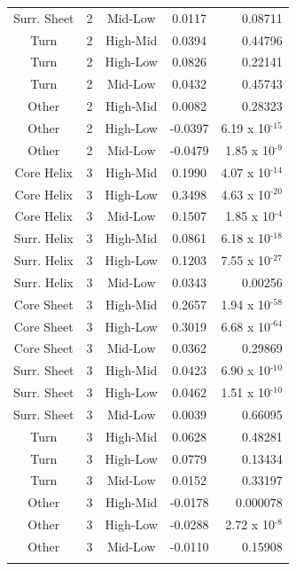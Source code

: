 \begin{table}[H]
\begin{tabular}{@{}ccccr@{}}
Surr. Sheet & 2 & Mid-Low  & 0.0117  & 0.08711                   \\
\arrayrulecolor[gray]{0.8}\hline
Turn        & 2 & High-Mid & 0.0394  & 0.44796                   \\
Turn        & 2 & High-Low & 0.0826  & 0.22141                   \\
Turn        & 2 & Mid-Low  & 0.0432  & 0.45743                   \\
\arrayrulecolor[gray]{0.8}\hline
Other       & 2 & High-Mid & 0.0082  & 0.28323                   \\
Other       & 2 & High-Low & -0.0397 & 6.19 x 10\(^{\text{-15}}\)  \\
Other       & 2 & Mid-Low  & -0.0479 & 1.85 x 10\(^{\text{-9}}\)   \\
\arrayrulecolor[gray]{0.8}\hline
Core Helix  & 3 & High-Mid & 0.1990  & 4.07 x 10\(^{\text{-14}}\)  \\
Core Helix  & 3 & High-Low & 0.3498  & 4.63 x 10\(^{\text{-20}}\)  \\
Core Helix  & 3 & Mid-Low  & 0.1507  & 1.85 x 10\(^{\text{-4}}\)   \\
\arrayrulecolor[gray]{0.8}\hline
Surr. Helix & 3 & High-Mid & 0.0861  & 6.18 x 10\(^{\text{-18}}\)  \\
Surr. Helix & 3 & High-Low & 0.1203  & 7.55 x 10\(^{\text{-27}}\)  \\
Surr. Helix & 3 & Mid-Low  & 0.0343  & 0.00256                   \\
\arrayrulecolor[gray]{0.8}\hline
Core Sheet  & 3 & High-Mid & 0.2657  & 1.94 x 10\(^{\text{-58}}\)  \\
Core Sheet  & 3 & High-Low & 0.3019  & 6.68 x 10\(^{\text{-64}}\)  \\
Core Sheet  & 3 & Mid-Low  & 0.0362  & 0.29869                   \\
\arrayrulecolor[gray]{0.8}\hline
Surr. Sheet & 3 & High-Mid & 0.0423  & 6.90 x 10\(^{\text{-10}}\)  \\
Surr. Sheet & 3 & High-Low & 0.0462  & 1.51 x 10\(^{\text{-10}}\)  \\
Surr. Sheet & 3 & Mid-Low  & 0.0039  & 0.66095                   \\
\arrayrulecolor[gray]{0.8}\hline
Turn        & 3 & High-Mid & 0.0628  & 0.48281                   \\
Turn        & 3 & High-Low & 0.0779  & 0.13434                   \\
Turn        & 3 & Mid-Low  & 0.0152  & 0.33197                   \\
\arrayrulecolor[gray]{0.8}\hline
Other       & 3 & High-Mid & -0.0178 & 0.000078                  \\
Other       & 3 & High-Low & -0.0288 & 2.72 x 10\(^{\text{-8}}\)   \\
Other       & 3 & Mid-Low  & -0.0110 & 0.15908                   \\ \arrayrulecolor{black} \bottomrule
\end{tabular}
	\label{table:mann_whitney_results_md}
\end{table}

